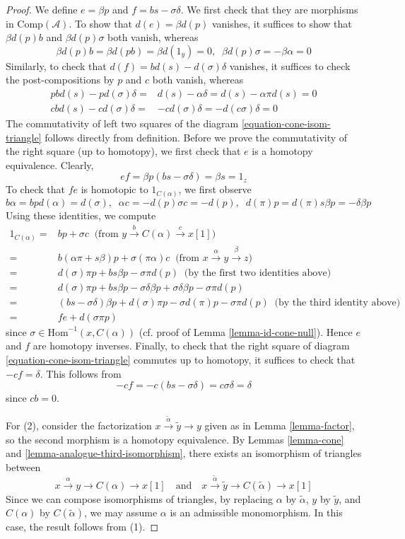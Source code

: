 \begin{proof}
\medskip\noindent
We define $e=\beta p$ and $f=bs-\sigma\delta$. We first check that they are
morphisms in $\text{Comp}(\mathcal{A})$. To show that $d(e)=\beta d(p)$
vanishes, it suffices to show that $\beta d(p)b$ and $\beta d(p)\sigma$
both vanish, whereas
$$
\beta d(p)b = \beta d(pb) = \beta d(1_y) = 0,\;\;
\beta d(p)\sigma = -\beta\alpha = 0
$$
Similarly, to check that $d(f)=bd(s)-d(\sigma)\delta$ vanishes,
it suffices to check the post-compositions by $p$ and $c$ both vanish,
whereas
\begin{align*}
pbd(s) - pd(\sigma)\delta
= &
d(s)-\alpha\delta = d(s)-\alpha\pi d(s) = 0 \\
cbd(s)-cd(\sigma)\delta
= &
-cd(\sigma)\delta = -d(c\sigma)\delta = 0
\end{align*}
The commutativity of left two squares of the
diagram \ref{equation-cone-isom-triangle} follows directly from definition.
Before we prove the commutativity of the right square (up to homotopy),
we first check that $e$ is a homotopy equivalence. Clearly,
$$
ef=\beta p (bs-\sigma\delta)=\beta s=1_z
$$
To check that $fe$ is homotopic to $1_{C(\alpha)}$, we first observe
$$
b\alpha =
bpd(\alpha) =
d(\sigma),\;\;
\alpha c = -d(p)\sigma c = -d(p),\;\;
d(\pi)p = d(\pi)s\beta p = -\delta\beta p
$$
Using these identities, we compute
\begin{align*}
1_{C(\alpha)} = &
bp+\sigma c\;\;
\text{(from $y\xrightarrow{b}C(\alpha)\xrightarrow{c}x[1]$)} \\
= &
b(\alpha\pi+s\beta)p+\sigma(\pi\alpha)c\;\;
\text{(from $x\xrightarrow{\alpha} y\xrightarrow{\beta} z$)} \\
= &
d(\sigma)\pi p+bs\beta p-\sigma\pi d(p)\;\;
\text{(by the first two identities above)} \\
= &
d(\sigma)\pi p + bs\beta p - \sigma\delta\beta p
+ \sigma\delta\beta p - \sigma\pi d(p) \\
= &
(bs-\sigma\delta)\beta p + d(\sigma)\pi p
- \sigma d(\pi)p - \sigma\pi d(p)\;\;
\text{(by the third identity above)} \\
= &
fe+d(\sigma \pi p)
\end{align*}
since $\sigma\in\mathrm{Hom}^{-1}(x,C(\alpha))$
(cf. proof of Lemma \ref{lemma-id-cone-null}).
Hence $e$ and $f$ are homotopy inverses.
Finally, to check that the right square of
diagram \ref{equation-cone-isom-triangle} commutes up to homotopy,
it suffices to check that $-cf=\delta$. This follows from
$$
-cf = -c(bs-\sigma\delta) = c\sigma\delta = \delta
$$
since $cb=0$.

\medskip\noindent
For (2), consider the factorization
$x\xrightarrow{\tilde{\alpha}}\tilde{y}\to y$
given as in Lemma \ref{lemma-factor}, so the second morphism
is a homotopy equivalence. By Lemmas \ref{lemma-cone} and
\ref{lemma-analogue-third-isomorphism}, there
exists an isomorphism of triangles between
$$
x \xrightarrow{\alpha} y \to C(\alpha) \to x[1]
\quad\text{and}\quad
x \xrightarrow{\tilde{\alpha}} \tilde{y} \to C(\tilde{\alpha}) \to x[1]
$$
Since we can compose isomorphisms of triangles, by replacing
$\alpha$ by $\tilde{\alpha}$, $y$ by $\tilde{y}$, and $C(\alpha)$ by
$C(\tilde{\alpha})$, we may assume $\alpha$ is an admissible monomorphism.
In this case, the result follows from (1).
\end{proof}

